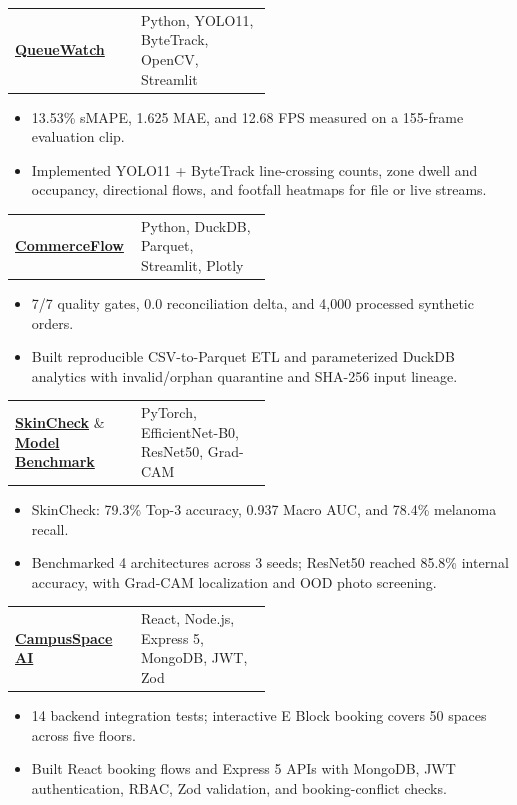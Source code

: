 \documentclass[10pt,letterpaper]{article}
\makeatletter
\newcommand{\projectheading}[3]{%
  \begin{tabularx}{\linewidth}{@{}>{\raggedright\arraybackslash}X>{\raggedleft\arraybackslash}p{0.51\linewidth}@{}}
    \href{#2}{\textbf{#1}} & {\footnotesize #3}\\
  \end{tabularx}%
}
\makeatother
\begin{document}
\projectheading{QueueWatch}{https://github.com/NikithPrasad/QueueWatch}{Python, YOLO11, ByteTrack, OpenCV, Streamlit}
\begin{itemize}
  \item 13.53\% sMAPE, 1.625 MAE, and 12.68 FPS measured on a 155-frame evaluation clip.
  \item Implemented YOLO11 + ByteTrack line-crossing counts, zone dwell and occupancy, directional flows, and footfall heatmaps for file or live streams.
\end{itemize}
\vspace{3.5pt}

\projectheading{CommerceFlow}{https://github.com/NikithPrasad/CommerceFlow}{Python, DuckDB, Parquet, Streamlit, Plotly}
\begin{itemize}
  \item 7/7 quality gates, 0.0 reconciliation delta, and 4,000 processed synthetic orders.
  \item Built reproducible CSV-to-Parquet ETL and parameterized DuckDB analytics with invalid/orphan quarantine and SHA-256 input lineage.
\end{itemize}
\vspace{3.5pt}

\begin{tabularx}{\linewidth}{@{}>{\raggedright\arraybackslash}X>{\raggedleft\arraybackslash}p{0.51\linewidth}@{}}
  \href{https://github.com/NikithPrasad/Skin-Disease-Detection}{\textbf{SkinCheck}} \&
  \href{https://github.com/NikithPrasad/Skin-Disease-Model-Comparison}{\textbf{Model Benchmark}} &
  {\footnotesize PyTorch, EfficientNet-B0, ResNet50, Grad-CAM}\\
\end{tabularx}
\begin{itemize}
  \item SkinCheck: 79.3\% Top-3 accuracy, 0.937 Macro AUC, and 78.4\% melanoma recall.
  \item Benchmarked 4 architectures across 3 seeds; ResNet50 reached 85.8\% internal accuracy, with Grad-CAM localization and OOD photo screening.
\end{itemize}
\vspace{3.5pt}
\projectheading{CampusSpace AI}{https://github.com/NikithPrasad/CampusSpace-AI}{React, Node.js, Express 5, MongoDB, JWT, Zod}
\begin{itemize}
  \item 14 backend integration tests; interactive E Block booking covers 50 spaces across five floors.
  \item Built React booking flows and Express 5 APIs with MongoDB, JWT authentication, RBAC, Zod validation, and booking-conflict checks.
\end{itemize}
\end{document}
